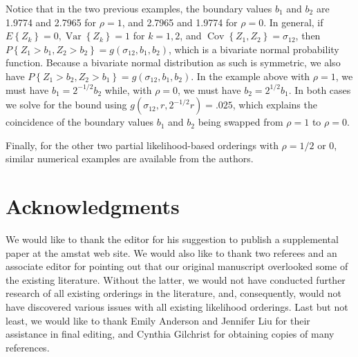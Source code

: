 \documentclass[10pt]{article}
\begin{document}
Notice that in the two previous examples, the boundary values $b_{1}$ and $b_{2}$ are 1.9774 and 2.7965 for $\rho=1$, and 2.7965 and 1.9774 for $\rho=0$. In general, if $E\left\{Z_{k}\right\}=0, \operatorname{Var}\left\{Z_{k}\right\}=1$ for $k=1,2$, and $\operatorname{Cov}\left\{Z_{1}, Z_{2}\right\}=\sigma_{12}$, then $P\left\{Z_{1}>b_{1}, Z_{2}>b_{2}\right\}=g\left(\sigma_{12}, b_{1}, b_{2}\right)$, which is a bivariate normal probability function. Because a bivariate normal distribution as such is symmetric, we also have $P\left\{Z_{1}>b_{2}, Z_{2}>b_{1}\right\}=g\left(\sigma_{12}, b_{1}, b_{2}\right)$. In the example above with $\rho=1$, we must have $b_{1}=2^{-1 / 2} b_{2}$ while, with $\rho=0$, we must have $b_{2}=2^{1 / 2} b_{1}$. In both cases we solve for the bound using $g\left(\sigma_{12}, r, 2^{-1 / 2} r\right)=.025$, which explains the coincidence of the boundary values $b_{1}$ and $b_{2}$ being swapped from $\rho=1$ to $\rho=0$.

Finally, for the other two partial likelihood-based orderings with $\rho=1 / 2$ or 0, similar numerical examples are available from the authors.

\section*{Acknowledgments}
We would like to thank the editor for his suggestion to publish a supplemental paper at the amstat web site. We would also like to thank two referees and an associate editor for pointing out that our original manuscript overlooked some of the existing literature. Without the latter, we would not have conducted further research of all existing orderings in the literature, and, consequently, would not have discovered various issues with all existing likelihood orderings. Last but not least, we would like to thank Emily Anderson and Jennifer Liu for their assistance in final editing, and Cynthia Gilchrist for obtaining copies of many references.
\end{document}
